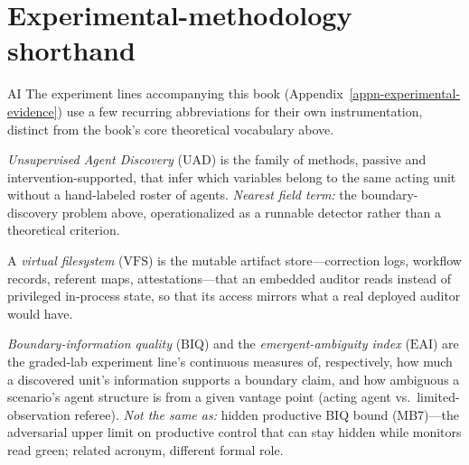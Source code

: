 \section*{Experimental-methodology shorthand}
\label{sec:experimental-methodology-shorthand}
\begin{authbar}{AI}
The experiment lines accompanying this book (Appendix~\ref{appn-experimental-evidence}) use a few recurring abbreviations for their own instrumentation, distinct from the book's core theoretical vocabulary above.

\label{gloss:uad}\emph{Unsupervised Agent Discovery} (\(\mathrm{UAD}\)) is the family of methods, passive and intervention-supported, that infer which variables belong to the same acting unit without a hand-labeled roster of agents. \emph{Nearest field term:} the boundary-discovery problem above, operationalized as a runnable detector rather than a theoretical criterion.

\label{gloss:vfs}A \emph{virtual filesystem} (\(\mathrm{VFS}\)) is the mutable artifact store---correction logs, workflow records, referent maps, attestations---that an embedded auditor reads instead of privileged in-process state, so that its access mirrors what a real deployed auditor would have.

\label{gloss:biq-eai}\emph{Boundary-information quality} (\(\mathrm{BIQ}\)) and the \emph{emergent-ambiguity index} (\(\mathrm{EAI}\)) are the graded-lab experiment line's continuous measures of, respectively, how much a discovered unit's information supports a boundary claim, and how ambiguous a scenario's agent structure is from a given vantage point (acting agent vs.\ limited-observation referee).
\emph{Not the same as:} hidden productive BIQ bound (MB7)---the adversarial upper limit on productive control that can stay hidden while monitors read green; related acronym, different formal role.

\end{authbar}
\authbarneedspace
